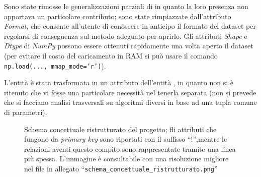 \documentclass{article}
\begin{document}
Sono state rimosse le generalizzazioni parziali di  in quanto la loro presenza non apportava un particolare contributo; sono state rimpiazzate dall'attributo \emph{Format}, che consente all'utente di conoscere in anticipo il formato del dataset per regolarsi di conseguenza sul metodo adeguato per aprirlo. Gli attributi \emph{Shape} e \emph{Dtype} di \emph{NumPy} possono essere ottenuti rapidamente una volta aperto il dataset (per evitare il costo del caricamento in RAM si può usare il comando \texttt{np.load(..., mmap\_mode='r')}).

L'entità  è stata trasformata in un attributo dell'entità , in quanto non si è ritenuto che vi fosse una particolare necessità nel tenerla separata (non si prevede che si facciano analisi trasversali su algoritmi diversi in base ad una tupla comune di parametri).

\begin{figure}[H]
    \caption{Schema concettuale ristrutturato del progetto; fli attributi che fungono da \emph{primary key} sono riportati con il suffisso ``!'',mentre le relazioni aventi questo compito sono rappresentate tramite una linea più spessa. L'immagine è consultabile con una risoluzione migliore nel file in allegato ``\texttt{schema\_concettuale\_ristrutturato.png}''}
\end{figure}
\end{document}
